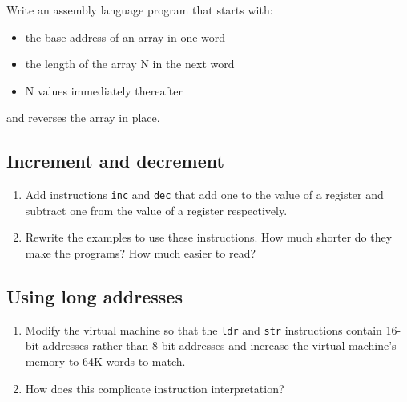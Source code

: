 \documentclass[krantzl]{krantz}
\begin{document}
Write an assembly language program that starts with:

\begin{itemize}

\item the base address of an array in one word

\item the length of the array N in the next word

\item N values immediately thereafter

\end{itemize}


\noindent and reverses the array in place.

\subsection*{Increment and decrement}

\begin{enumerate}

\item 

Add instructions \texttt{inc} and \texttt{dec} that add one to the value of a register
    and subtract one from the value of a register respectively.



\item 

Rewrite the examples to use these instructions.
    How much shorter do they make the programs?
    How much easier to read?



\end{enumerate}

\subsection*{Using long addresses}

\begin{enumerate}

\item 

Modify the virtual machine so that the \texttt{ldr} and \texttt{str} instructions
    contain 16-bit addresses rather than 8-bit addresses
    and increase the virtual machine's memory to 64K words to match.



\item 

How does this complicate instruction interpretation?



\end{enumerate}
\end{document}
